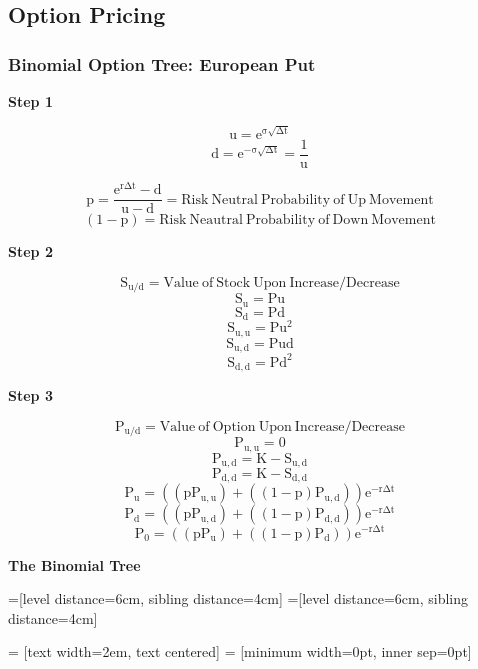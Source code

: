\documentclass[11pt, english]{article}
\begin{document}
\newpage

	\subsection{Option Pricing}

		\subsubsection{Binomial Option Tree: European Put}

	\textbf{Step 1}

	$$\mathrm{u=e^{\sigma\sqrt{\Delta t}}}$$
	$$\mathrm{d=e^{-\sigma\sqrt{\Delta t}}=\frac{1}{u}}$$

	$$\mathrm{p=\frac{e^{r\Delta t}-d}{u-d}=Risk\ Neutral\ Probability\ of\ Up\ Movement}$$
	$$\mathrm{(1-p)=Risk\ Neautral\ Probability\ of\ Down\ Movement}$$

	\textbf{Step 2}

	$$\mathrm{S_{u/d}=Value\ of\ Stock\ Upon\ Increase/Decrease}$$
	$$\mathrm{S_u=Pu}$$
	$$\mathrm{S_d=Pd}$$
	$$\mathrm{S_{u,u}=Pu^2}$$
	$$\mathrm{S_{u,d}=Pud}$$
	$$\mathrm{S_{d,d}=Pd^2}$$

	\textbf{Step 3}

	$$\mathrm{P_{u/d}=Value\ of\ Option\ Upon\ Increase/Decrease}$$
	$$\mathrm{P_{u,u}=0}$$
	$$\mathrm{P_{u,d}=K-S_{u,d}}$$
	$$\mathrm{P_{d,d}=K-S_{d,d}}$$
	$$\mathrm{P_u=\left((pP_{u,u})+\left((1-p)P_{u,d}\right)\right)e^{-r\Delta t}}$$
	$$\mathrm{P_d=\left((pP_{u,d})+\left((1-p)P_{d,d}\right)\right)e^{-r\Delta t}}$$
	$$\mathrm{P_0=\left((pP_u)+\left((1-p)P_d\right)\right)e^{-r\Delta t}}$$

	\newpage

	\textbf{The Binomial Tree}

	=[level distance=6cm, sibling distance=4cm]
	=[level distance=6cm, sibling distance=4cm]

	 = [text width=2em, text centered]
	 = [minimum width=0pt, inner sep=0pt]
\end{document}
